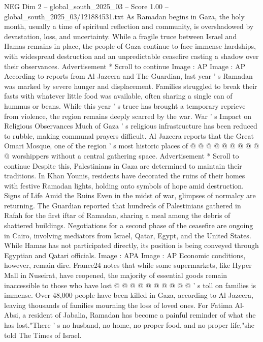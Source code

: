 \begin{textsample}{NEG Dim 2 – global\_south\_2025\_03 – Score 1.00 – global\_south\_2025\_03/121884531.txt}  \label{ex:f2_neg_157}
As Ramadan begins in Gaza, the holy month, usually a time of spiritual reflection and community, is overshadowed by devastation, loss, and uncertainty.
While a fragile truce between Israel and Hamas remains in place, the people of Gaza continue to face immense hardships, with widespread destruction and an unpredictable ceasefire casting a shadow over their observances.
Advertisement * Scroll to continue Image : AP Image : AP According to reports from Al Jazeera and The Guardian, last year ' s Ramadan was marked by severe hunger and displacement.
Families struggled to break their fasts with whatever little food was available, often sharing a single can of hummus or beans.
While this year ' s truce has brought a temporary reprieve from violence, the region remains deeply scarred by the war.
War ' s Impact on Religious Observances Much of Gaza ' s religious infrastructure has been reduced to rubble, making communal prayers difficult.
Al Jazeera reports that the Great Omari Mosque, one of the region ' s most historic places of @ @ @ @ @ @ @ @ @ @ worshippers without a central gathering space.
Advertisement * Scroll to continue Despite this, Palestinians in Gaza are determined to maintain their traditions.
In Khan Younis, residents have decorated the ruins of their homes with festive Ramadan lights, holding onto symbols of hope amid destruction.
Signs of Life Amid the Ruins Even in the midst of war, glimpses of normalcy are returning.
The Guardian reported that hundreds of Palestinians gathered in Rafah for the first iftar of Ramadan, sharing a meal among the debris of shattered buildings.
Negotiations for a second phase of the ceasefire are ongoing in Cairo, involving mediators from Israel, Qatar, Egypt, and the United States.
While Hamas has not participated directly, its position is being conveyed through Egyptian and Qatari officials.
Image : APA Image : AP Economic conditions, however, remain dire.
France24 notes that while some supermarkets, like Hyper Mall in Nuseirat, have reopened, the majority of essential goods remain inaccessible to those who have lost @ @ @ @ @ @ @ @ @ @ ' s toll on families is immense.
Over 48,000 people have been killed in Gaza, according to Al Jazeera, leaving thousands of families mourning the loss of loved ones.
For Fatima Al-Absi, a resident of Jabalia, Ramadan has become a painful reminder of what she has lost."There ' s no husband, no home, no proper food, and no proper life,"she told The Times of Israel.

\end{textsample}
